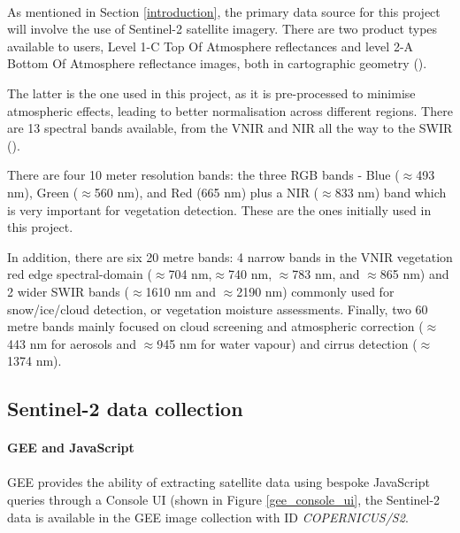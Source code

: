 \paragraph{}
As mentioned in Section \ref{introduction}, the primary data source for this project will involve the use of Sentinel-2 satellite imagery. There are two product types available to users, Level 1-C Top Of Atmosphere reflectances and level 2-A Bottom Of Atmosphere reflectance images, both in cartographic geometry (\cite{sentinel2}). 

The latter is the one used in this project, as it is pre-processed to minimise atmospheric effects, leading to better normalisation across different regions.
There are 13 spectral bands available, from the \gls{VNIR} and \gls{NIR} all the way to the \gls{SWIR} (\cite{sentinel2}).

There are four 10 meter resolution bands: the three \gls{RGB} bands - Blue ($\approx$493 nm), Green ($\approx$560 nm), and Red (665 nm) plus a \gls{NIR} ($\approx$833 nm) band which is very important for vegetation detection. These are the ones initially used in this project.

In addition, there are six 20 metre bands: 4 narrow bands in the \gls{VNIR} vegetation red edge spectral-domain ($\approx$704 nm,$\approx$740 nm, $\approx$783 nm, and $\approx$865 nm) and 2 wider \gls{SWIR} bands ($\approx$1610 nm and $\approx$2190 nm) commonly used for snow/ice/cloud detection, or vegetation moisture assessments. Finally, two 60 metre bands mainly focused on cloud screening and atmospheric correction ($\approx$443 nm for aerosols and $\approx$945 nm for water vapour) and cirrus detection ($\approx$1374 nm).

\subsection{Sentinel-2 data collection} \label{rs_data_collection}
\paragraph{\gls{GEE} and JavaScript}
\paragraph{}
\gls{GEE} provides the ability of extracting satellite data using bespoke JavaScript queries through a Console \gls{UI} (shown in Figure \ref{gee_console_ui}, the Sentinel-2 data is available in the \gls{GEE} image collection with ID \textit{COPERNICUS/S2}.

